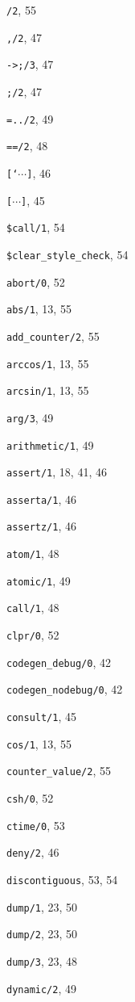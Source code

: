 \begin{theindex}

  \item {\tt */2}, 55
  \item {\tt ,/2}, 47
  \item {\tt ->;/3}, 47
  \item {\tt ;/2}, 47
  \item {\tt =../2}, 49
  \item {\tt ==/2}, 48
  \item {\tt [`{$\cdots$}]}, 46
  \item {\tt [{$\cdots$}]}, 45
  \item {\tt \$call/1}, 54
  \item {\tt \$clear\_style\_check}, 54
  \item {\tt abort/0}, 52
  \item {\tt abs/1}, 13, 55
  \item {\tt add\_counter/2}, 55
  \item {\tt arccos/1}, 13, 55
  \item {\tt arcsin/1}, 13, 55
  \item {\tt arg/3}, 49
  \item {\tt arithmetic/1}, 49
  \item {\tt assert/1}, 18, 41, 46
  \item {\tt asserta/1}, 46
  \item {\tt assertz/1}, 46
  \item {\tt atom/1}, 48
  \item {\tt atomic/1}, 49
  \item {\tt call/1}, 48
  \item {\tt clpr/0}, 52
  \item {\tt codegen\_debug/0}, 42
  \item {\tt codegen\_nodebug/0}, 42
  \item {\tt consult/1}, 45
  \item {\tt cos/1}, 13, 55
  \item {\tt counter\_value/2}, 55
  \item {\tt csh/0}, 52
  \item {\tt ctime/0}, 53
  \item {\tt deny/2}, 46
  \item {\tt discontiguous}, 53, 54
  \item {\tt dump/1}, 23, 50
  \item {\tt dump/2}, 23, 50
  \item {\tt dump/3}, 23, 48
  \item {\tt dynamic/2}, 49

\end{theindex}
